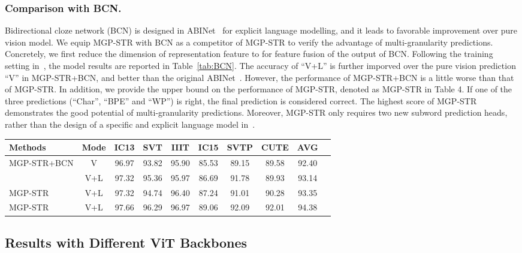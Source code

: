 \documentclass[runningheads]{llncs}
\newcommand{\ra}[1]{\renewcommand{\arraystretch}{#1}}
\begin{document}
\subsubsection{Comparison with BCN.}
Bidirectional cloze network (BCN) is designed in ABINet~\cite{ABInet} for explicit language modelling, and it leads to favorable improvement over pure vision model. We equip MGP-STR with BCN as a competitor of MGP-STR to verify the advantage of multi-granularity predictions. Concretely, we first reduce the dimension  of representation feature  to  for feature fusion of the output of BCN. Following the training setting in~\cite{ABInet}, the model results are reported in Table~\ref{tab:BCN}.  The accuracy of ``V+L'' is  further imporved over the pure vision prediction ``V'' in MGP-STR+BCN, and better than the original ABINet~\cite{ABInet}. However, the performance of MGP-STR+BCN is a little worse than that of MGP-STR. In addition, we provide the upper bound on the performance of MGP-STR, denoted as MGP-STR in Table 4. If one of the three predictions (``Char'', ``BPE'' and ``WP'') is right, the final prediction is considered correct. 
The highest score of MGP-STR demonstrates the good potential of  multi-granularity predictions.
Moreover, MGP-STR only requires two new subword prediction heads, rather than the design of a specific and explicit language model in~\cite{ABInet,SRN}. 


\begin{table*}[t]\centering
\setlength{\tabcolsep}{4pt}
\ra{1}
\caption{The accuracy results of MGP-STR equipped with BCN and multi-granularity prediction. ``V'' represents the results of the pure vision output. ``V+L'' represents the results based on the both vision and language parts.}
\label{tab:BCN}
\begin{tabular}{|l|c|c|c|c|c|c|c|c|c|}
\hline
Methods & Mode &IC13&SVT  &IIIT   & IC15 & SVTP &CUTE  &AVG \\
\hline
\multirow{2}{*}{MGP-STR+BCN}  &  V &96.97	&93.82	&95.90	&85.53	&89.15	&89.58	&92.40	 \\
& V+L &97.32	&95.36	&95.97	&86.69	&91.78	&89.93	&93.14	 \\
\hline
MGP-STR   & V+L &97.32	&94.74	&96.40	&87.24	&91.01	&90.28	&93.35	 \\
MGP-STR   & V+L &97.66	&96.29	&96.97	&89.06	&92.09	&92.01	&94.38	 \\
\hline
\end{tabular}
\end{table*}

\subsection{Results with Different ViT Backbones} 
\end{document}

